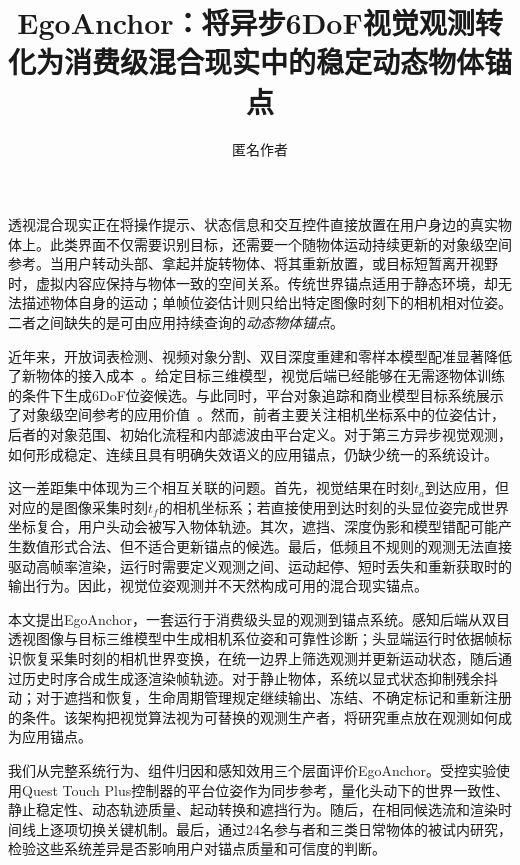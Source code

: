\documentclass[review]{vgtc}
\title{EgoAnchor：将异步6DoF视觉观测转化为消费级混合现实中的稳定动态物体锚点}
\author{匿名作者}
\newcommand{\system}{EgoAnchor}
\begin{document}
\maketitle

透视混合现实正在将操作提示、状态信息和交互控件直接放置在用户身边的真实物体上。此类界面不仅需要识别目标，还需要一个随物体运动持续更新的对象级空间参考。当用户转动头部、拿起并旋转物体、将其重新放置，或目标短暂离开视野时，虚拟内容应保持与物体一致的空间关系。传统世界锚点适用于静态环境，却无法描述物体自身的运动；单帧位姿估计则只给出特定图像时刻下的相机相对位姿。二者之间缺失的是可由应用持续查询的\emph{动态物体锚点}。

近年来，开放词表检测、视频对象分割、双目深度重建和零样本模型配准显著降低了新物体的接入成本~\cite{posecnn2017,densefusion2019,cosypose2020,megapose2022,foundationpose2023}。给定目标三维模型，视觉后端已经能够在无需逐物体训练的条件下生成6DoF位姿候选。与此同时，平台对象追踪和商业模型目标系统展示了对象级空间参考的应用价值~\cite{appleObjectAnchor,azureObjectAnchors,vuforiaModelTargets,metaDynamicObjectTracker}。然而，前者主要关注相机坐标系中的位姿估计，后者的对象范围、初始化流程和内部滤波由平台定义。对于第三方异步视觉观测，如何形成稳定、连续且具有明确失效语义的应用锚点，仍缺少统一的系统设计。

这一差距集中体现为三个相互关联的问题。首先，视觉结果在时刻$t_a$到达应用，但对应的是图像采集时刻$t_f$的相机坐标系；若直接使用到达时刻的头显位姿完成世界坐标复合，用户头动会被写入物体轨迹。其次，遮挡、深度伪影和模型错配可能产生数值形式合法、但不适合更新锚点的候选。最后，低频且不规则的观测无法直接驱动高帧率渲染，运行时需要定义观测之间、运动起停、短时丢失和重新获取时的输出行为。因此，视觉位姿观测并不天然构成可用的混合现实锚点。

本文提出\system，一套运行于消费级头显的观测到锚点系统。感知后端从双目透视图像与目标三维模型中生成相机系位姿和可靠性诊断；头显端运行时依据帧标识恢复采集时刻的相机世界变换，在统一边界上筛选观测并更新运动状态，随后通过历史时序合成生成逐渲染帧轨迹。对于静止物体，系统以显式状态抑制残余抖动；对于遮挡和恢复，生命周期管理规定继续输出、冻结、不确定标记和重新注册的条件。该架构把视觉算法视为可替换的观测生产者，将研究重点放在观测如何成为应用锚点。

我们从完整系统行为、组件归因和感知效用三个层面评价\system。受控实验使用Quest Touch Plus控制器的平台位姿作为同步参考，量化头动下的世界一致性、静止稳定性、动态轨迹质量、起动转换和遮挡行为。随后，在相同候选流和渲染时间线上逐项切换关键机制。最后，通过24名参与者和三类日常物体的被试内研究，检验这些系统差异是否影响用户对锚点质量和可信度的判断。
\end{document}
